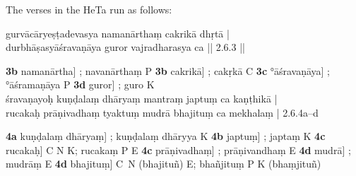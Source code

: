 \documentclass[naipra.tex]{subfiles}
\begin{document}
\begin{sanskrit}
{\begin{english}
	The verses in the HeTa run as follows:

	\begin{prosequote}%
		gurvācāryeṣṭadevasya namanārthaṃ cakrikā dhṛtā |\\
		durbhāṣasyāśravaṇāya guror vajradharasya ca || 2.6.3 ||
		\medskip	

		\noindent \textbf{3b} namanārtha] ; navanārthaṃ P
		\textbf{3b} cakrikā] ; cakṛkā C
		\textbf{3c} °āśravaṇāya] ; °āśramaṇāya P
		\textbf{3d} guror] ; guro K\\

		\noindent śravaṇayoḥ kuṇḍalaṃ dhāryaṃ mantraṃ japtuṃ ca kaṇṭhikā |\\
		rucakaḥ prāṇivadhaṃ tyaktuṃ mudrā bhajituṃ ca mekhalaṃ | 2.6.4a–d
		\medskip

		\noindent \textbf{4a} kuṇḍalaṃ dhāryaṃ] ; kuṇḍalaṃ dhāryya K
		\textbf{4b} japtuṃ] ; japtaṃ K
		\textbf{4c} rucakaḥ] C N K; rucakaṃ P E
		\textbf{4c} prāṇivadhaṃ] ; prāṇivandhaṃ E
		\textbf{4d} mudrā] ; mudrāṃ E
		\textbf{4d} bhajituṃ] C\PCreading\ N (bhajituñ) E; bhañjituṃ P K (bhaṃjituñ)
	\end{prosequote}


\end{english}}
\end{sanskrit}
\end{document}
